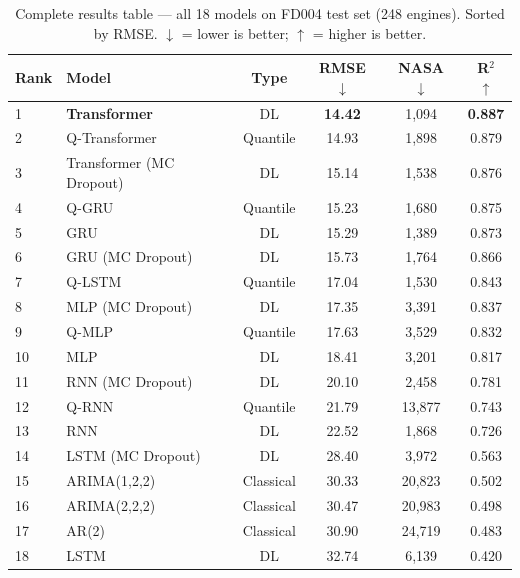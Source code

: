 \documentclass[12pt,a4paper]{report}
\begin{document}
\begin{table}[H]
\centering
\caption{Complete results table — all 18 models on FD004 test set (248 engines). Sorted by RMSE. $\downarrow$ = lower is better; $\uparrow$ = higher is better.}
\label{tab:full_results}
\begin{tabular}{llcccc}
\toprule
\textbf{Rank} & \textbf{Model} & \textbf{Type} & \textbf{RMSE} $\downarrow$ & \textbf{NASA} $\downarrow$ & \textbf{R$^2$} $\uparrow$ \\
\midrule
1  & \textbf{Transformer}       & DL       & \textbf{14.42} & 1{,}094 & \textbf{0.887} \\
2  & Q-Transformer              & Quantile & 14.93 & 1{,}898 & 0.879 \\
3  & Transformer (MC Dropout)   & DL       & 15.14 & 1{,}538 & 0.876 \\
4  & Q-GRU                      & Quantile & 15.23 & 1{,}680 & 0.875 \\
5  & GRU                        & DL       & 15.29 & 1{,}389 & 0.873 \\
6  & GRU (MC Dropout)           & DL       & 15.73 & 1{,}764 & 0.866 \\
7  & Q-LSTM                     & Quantile & 17.04 & 1{,}530 & 0.843 \\
8  & MLP (MC Dropout)           & DL       & 17.35 & 3{,}391 & 0.837 \\
9  & Q-MLP                      & Quantile & 17.63 & 3{,}529 & 0.832 \\
10 & MLP                        & DL       & 18.41 & 3{,}201 & 0.817 \\
11 & RNN (MC Dropout)           & DL       & 20.10 & 2{,}458 & 0.781 \\
12 & Q-RNN                      & Quantile & 21.79 & 13{,}877 & 0.743 \\
13 & RNN                        & DL       & 22.52 & 1{,}868 & 0.726 \\
14 & LSTM (MC Dropout)          & DL       & 28.40 & 3{,}972 & 0.563 \\
15 & ARIMA(1,2,2)               & Classical& 30.33 & 20{,}823 & 0.502 \\
16 & ARIMA(2,2,2)               & Classical& 30.47 & 20{,}983 & 0.498 \\
17 & AR(2)                      & Classical& 30.90 & 24{,}719 & 0.483 \\
18 & LSTM                       & DL       & 32.74 & 6{,}139 & 0.420 \\
\bottomrule
\end{tabular}
\end{table}
\end{document}

